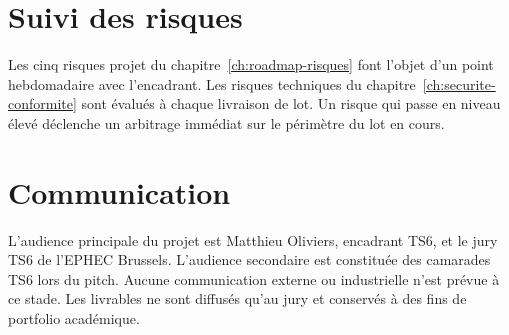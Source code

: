 \section{Suivi des risques}
\label{sec:suivi-risques}

Les cinq risques projet du chapitre~\ref{ch:roadmap-risques} font l'objet d'un point hebdomadaire avec l'encadrant. Les risques techniques du chapitre~\ref{ch:securite-conformite} sont évalués à chaque livraison de lot. Un risque qui passe en niveau élevé déclenche un arbitrage immédiat sur le périmètre du lot en cours.

\section{Communication}
\label{sec:communication}

L'audience principale du projet est Matthieu Oliviers, encadrant TS6, et le jury TS6 de l'EPHEC Brussels. L'audience secondaire est constituée des camarades TS6 lors du pitch. Aucune communication externe ou industrielle n'est prévue à ce stade. Les livrables ne sont diffusés qu'au jury et conservés à des fins de portfolio académique.
